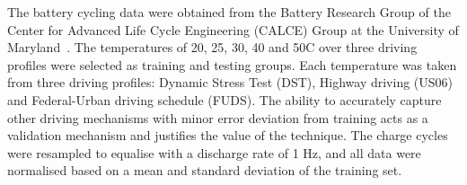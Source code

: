 %
%
{The battery cycling data were obtained from the Battery Research Group of the Center for Advanced Life Cycle Engineering (CALCE) Group at the University of Maryland~\cite{noauthor_calce_2017}.}
The temperatures of 20, 25, 30, 40 and 50\textdegree{}C over three driving profiles were selected as training and testing groups.
Each temperature was taken from three driving profiles: Dynamic Stress Test (DST), Highway driving (US06) and Federal-Urban driving schedule (FUDS).
The ability to accurately capture other driving mechanisms with minor error deviation from training acts as a validation mechanism and justifies the value of the technique.
The charge cycles were resampled to equalise with a discharge rate of 1 Hz, and all data were normalised based on a mean and standard deviation of the training set.

